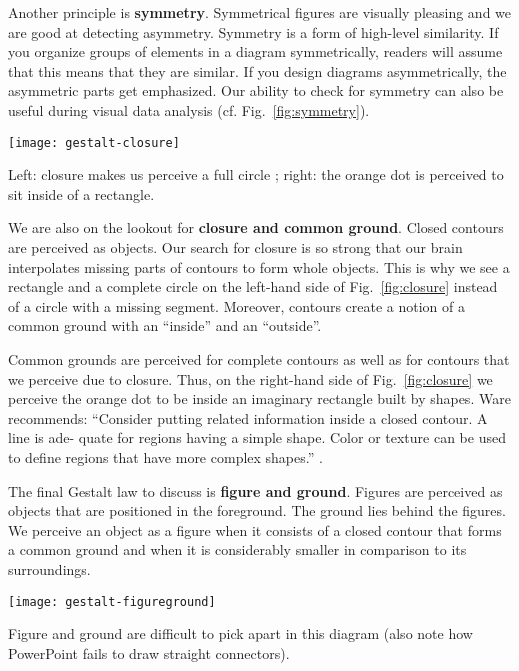 Another principle is \textbf{symmetry}. Symmetrical figures are visually pleasing and we are good at detecting asymmetry. Symmetry is a form of high-level similarity. If you organize groups of elements in a diagram symmetrically, readers will assume that this means that they are similar. If you design diagrams asymmetrically, the asymmetric parts get emphasized. Our ability to check for symmetry can also be useful during visual data analysis (cf. Fig.~\ref{fig:symmetry}).

\begin{marginfigure}
\centering
\texttt{[image: gestalt-closure]}
\caption{\label{fig:closure} Left: closure makes us perceive a full circle \cite{Ware12}; right: the orange dot is perceived to sit inside of a rectangle.}%
\end{marginfigure}

We are also on the lookout for \textbf{closure and common ground}. Closed contours are perceived as objects. Our search for closure is so strong that our brain interpolates missing parts of contours to form whole objects. This is why we see a rectangle and a complete circle on the left-hand side of Fig.~\ref{fig:closure} instead of a circle with a missing segment. Moreover, contours create a notion of a common ground with an ``inside'' and an ``outside''.

Common grounds are perceived for complete contours as well as for contours that we perceive due to closure. Thus, on the right-hand side of Fig.~\ref{fig:closure} we perceive the orange dot to be inside an imaginary rectangle built by shapes. Ware recommends: ``Consider putting related information inside a closed contour. A line is ade- quate for regions having a simple shape. Color or texture can be used to define regions that have more complex shapes.'' \cite{Ware12}.

The final Gestalt law to discuss is \textbf{figure and ground}. Figures are perceived as objects that are positioned in the foreground. The ground lies behind the figures. We perceive an object as a figure when it consists of a closed contour that forms a common ground and when it is considerably smaller in comparison to its surroundings.

\begin{marginfigure}
\centering
\texttt{[image: gestalt-figureground]}
\caption{\label{fig:figureground} Figure and ground are difficult to pick apart in this diagram (also note how PowerPoint fails to draw straight connectors).}%
\end{marginfigure}

